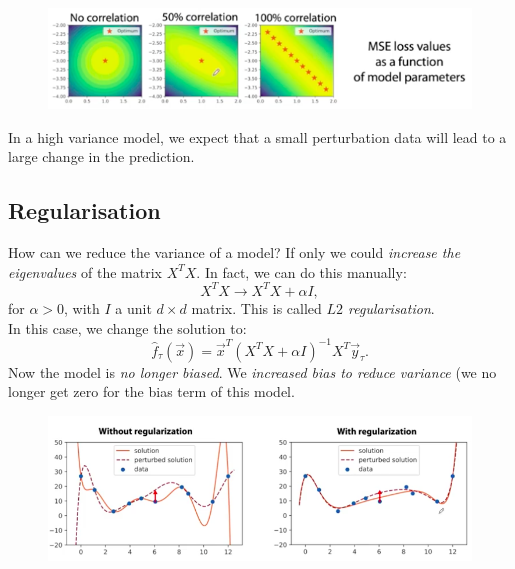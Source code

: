 \begin{frameex}
\begin{figure}[H]
\centering
\includegraphics[scale=0.4]{linearvariance.png}
\end{figure}
\end{frameex}

In a high variance model, we expect that a small perturbation data will lead to a large change in the prediction.


\minirule


\subsection{Regularisation}
How can we reduce the variance of a model? If only we could \textit{increase the eigenvalues} of the matrix $X^TX$. In fact, we can do this manually:
\begin{equation*}
X^TX \rightarrow X^TX + \alpha I,
\end{equation*}
for $\alpha > 0$, with $I$ a unit $d \times d$ matrix. This is called \textit{$L2$ regularisation}.\\

In this case, we change the solution to:
\begin{equation*}
\hat{f}_{\tau}(\vec{x}) = \vec{x}^T (X^TX + \alpha I)^{-1} X^T \vec{y}_{\tau}.
\end{equation*}
Now the model is \textit{no longer biased}. We \textit{increased bias to reduce variance} (we no longer get zero for the bias term of this model.
\begin{figure}[H]
\centering
\includegraphics[scale=0.4]{L2regularisation.png}
\end{figure}



